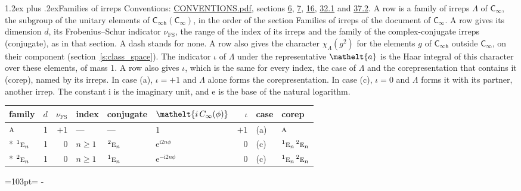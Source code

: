 \documentclass[10pt,a4paper]{article}
\makeatletter
\renewcommand\section{\@startsection{section}{1}{\z@}{-3ex plus -1ex minus -.2ex}%
  {1.2ex plus .2ex}{\normalfont\large\sffamily\bfseries\color{parttitle}}}
\newcommand{\needspace}[1]{\par\penalty-100\begingroup\dimen0=#1\relax\dimen2=\pagegoal
  \advance\dimen2-\pagetotal\ifdim\dimen0>\dimen2\relax\ifdim\dimen2>0pt\vfil\break\fi\fi
  \endgroup}
\numberwithin{equation}{section}
\newcommand{\eltfont}[1]{{\let\sigma\eltsigma\mathelt{#1}}}
\newcommand{\grp}[1]{\mathsf{#1}}
\newcommand{\irr}[1]{\text{\normalfont\scshape #1}}
\newcommand{\conjpair}[1]{{}^{#1}}
\newcommand{\comp}[1]{\eltfont{#1}}
\newcommand{\elt}[1]{\eltfont{#1}}
\newcommand{\iunit}{\mathrm{i}}
\newcommand{\expe}{\mathrm{e}}
\newcommand{\irchar}[1]{\chi_{#1}}
\newcommand{\fsind}{\nu_{\mathrm{FS}}}
\makeatother
\begin{document}
\section{Families of irreps}\label{s:families}
Conventions: \href{../../CONVENTIONS.pdf}{CONVENTIONS.pdf}, sections \href{../../../rotation/CONVENTIONS.pdf\#conv.6}{6}, \href{../../../rotation/CONVENTIONS.pdf\#conv.7}{7}, \href{../../../rotation/CONVENTIONS.pdf\#conv.16}{16}, \href{../../CONVENTIONS.pdf\#conv.32.1}{32.1} and \href{../../CONVENTIONS.pdf\#conv.37.2}{37.2}.
\leavevmode\label{n:irrep.Delta}\label{n:head.family.irreps}A row is a family of irreps $\Lambda$ of $\grp{C_{\infty}}$, the subgroup of the unitary elements of $\grp{C_{\infty h}}(\grp{C_{\infty}})$, in the order of the section Families of irreps of the document of \href{../../../rotation/data/pdf/Cinf.pdf}{$\grp{C_{\infty}}$}. \label{n:index.dimension}\label{n:index.frobenius}\label{n:head.index.family}\label{n:index.family}\label{n:head.conjugate}A row gives its dimension $d$, its Frobenius--Schur indicator $\fsind$, the range of the index of its irreps and the family of the complex-conjugate irreps (conjugate), as in that section. A dash stands for none. \label{n:function.character}A row also gives the character $\irchar{\Lambda}(g^2)$ for the elements $g$ of $\grp{C_{\infty h}}$ outside $\grp{C_{\infty}}$, on their component (section~\ref{s:class_space}). The indicator $\iota$ of $\Lambda$ under the representative $\elt{a}$ is the Haar integral of this character over these elements, of mass 1. \label{n:head.case.corep}\label{n:head.corep}A row also gives $\iota$, which is the same for every index, the case of $\Lambda$ and the corepresentation that contains it (corep), named by its irreps. In case (a), $\iota = +1$ and $\Lambda$ alone forms the corepresentation. In case (c), $\iota = 0$ and $\Lambda$ forms it with its partner, another irrep.
The constant $\iunit$ is the imaginary unit, and $\expe$ is the base of the natural logarithm.
{\small\renewcommand{\arraystretch}{1.25}\begin{longtable}{@{}lrrlllrll@{}}\toprule
family & $d$ & $\fsind$ & index & conjugate & $\comp{i\,C_{\infty}(\phi)}$ & $\iota$ & case & corep\\\midrule\endhead
\bottomrule\endfoot\endlastfoot
$\irr{a}$ & 1 & $+1$ & --- & --- & $1$ & $+1$ & (a) & $\irr{a}$\\*
$\conjpair{1}\irr{e}_{n}$ & 1 & $0$ & $n \ge 1$ & $\conjpair{2}\irr{e}_{n}$ & $\expe^{\iunit 2n\phi}$ & $0$ & (c) & $\conjpair{1}\irr{e}_{n}\,\conjpair{2}\irr{e}_{n}$\\*
$\conjpair{2}\irr{e}_{n}$ & 1 & $0$ & $n \ge 1$ & $\conjpair{1}\irr{e}_{n}$ & $\expe^{-\iunit 2n\phi}$ & $0$ & (c) & $\conjpair{1}\irr{e}_{n}\,\conjpair{2}\irr{e}_{n}$\\
\bottomrule\end{longtable}}
\needspace{103pt}
\end{document}
